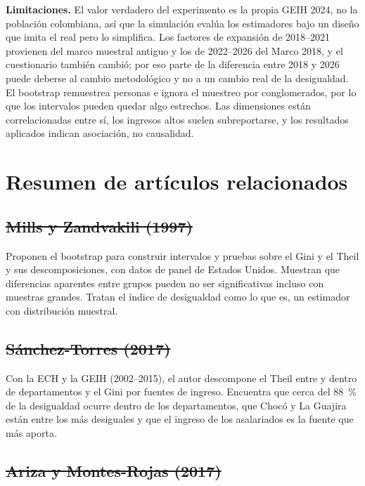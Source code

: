 \documentclass[12pt,letterpaper]{article}
\providecommand{\DIFaddtex}[1]{{\protect\color{BLUE}#1}} %
\providecommand{\DIFdeltex}[1]{{\protect\color{RED}\sout{#1}}} %
\providecommand{\DIFaddtex}[1]{\texorpdfstring{\DIFaddtex{#1}}{#1}} %
\providecommand{\DIFdeltex}[1]{\texorpdfstring{\DIFdeltex{#1}}{}} %
\providecommand{\DIFaddbegin}{}\providecommand{\DIFaddend}{} %
\providecommand{\DIFdelbegin}{}\providecommand{\DIFdelend}{} %
\providecommand{\DIFadd}[1]{\texorpdfstring{\DIFaddtex{#1}}{#1}} %
\providecommand{\DIFdel}[1]{\texorpdfstring{\DIFdeltex{#1}}{}} %
\begin{document}
\textbf{Limitaciones.} El valor verdadero del experimento es la propia GEIH 2024, no la población colombiana, así que la simulación evalúa los estimadores bajo un diseño que imita el real pero lo simplifica. \DIFaddbegin \DIFadd{Los factores de expansión de 2018--2021 provienen del marco muestral antiguo y los de 2022--2026 del Marco 2018, y el cuestionario también cambió; por eso parte de la diferencia entre 2018 y 2026 puede deberse al cambio metodológico y no a un cambio real de la desigualdad. El bootstrap remuestrea personas e ignora el muestreo por conglomerados, por lo que los intervalos pueden quedar algo estrechos. Las dimensiones están correlacionadas entre sí, los ingresos altos suelen subreportarse, y los resultados aplicados indican asociación, no causalidad.
}\DIFaddend 

\section{Resumen de artículos relacionados}

\subsection{\DIFdelbegin \DIFdel{Mills y Zandvakili (1997)}\DIFdelend \DIFaddbegin \texorpdfstring{\textcite{mills1997statistical}}{Mills y Zandvakili (1997)}\DIFaddend }

Proponen el bootstrap para construir intervalos y pruebas sobre el Gini y el Theil y sus descomposiciones, con datos de panel de Estados Unidos. Muestran que diferencias aparentes entre grupos pueden no ser significativas incluso con muestras grandes. Tratan el índice de desigualdad como lo que es, un estimador con distribución muestral.

\subsection{\DIFdelbegin \DIFdel{Sánchez-Torres (2017)}\DIFdelend \DIFaddbegin \texorpdfstring{\textcite{sanchez2017desigualdad}}{Sánchez-Torres (2017)}\DIFaddend }

Con la ECH y la GEIH (2002--2015), el autor descompone el Theil entre y dentro de departamentos y el Gini por fuentes de ingreso. Encuentra que cerca del 88~\% de la desigualdad ocurre dentro de los departamentos, que Chocó y La Guajira están entre los más desiguales y que el ingreso de los asalariados es la fuente que más aporta.


\subsection{\DIFdelbegin \DIFdel{Ariza y Montes-Rojas (2017)}\DIFdelend \DIFaddbegin \texorpdfstring{\textcite{ariza2017labour}}{Ariza y Montes-Rojas (2017)}\DIFaddend }
\end{document}
